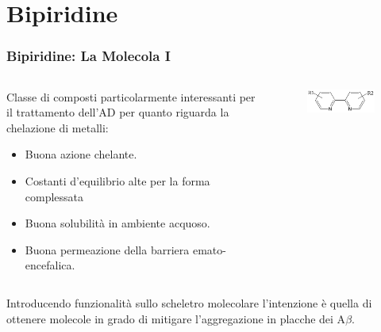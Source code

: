 \documentclass[9pt]{beamer}
\begin{document}
\section{Bipiridine}

\begin{frame}
	\frametitle{Bipiridine: La Molecola I}
	\begin{columns}
		\begin{column}{.6\textwidth}
			Classe di composti particolarmente interessanti per il trattamento dell'AD per quanto riguarda la chelazione di metalli:
			\begin{itemize}
				\item Buona azione chelante.
				\item Costanti d'equilibrio alte per la forma complessata
				\item Buona solubilità in ambiente acquoso.
				\item Buona permeazione della barriera emato-encefalica.
			\end{itemize}
		\end{column}
		\begin{column}{.4\textwidth}
			\begin{figure}
				\includegraphics[width=\textwidth]{immagini/bpy.png}
			\end{figure}
		\end{column}
	\end{columns}
	\bigskip
	Introducendo funzionalità sullo scheletro molecolare l'intenzione è quella di ottenere molecole in grado di mitigare l'aggregazione in placche dei A$\beta$.
\end{frame}
\end{document}
